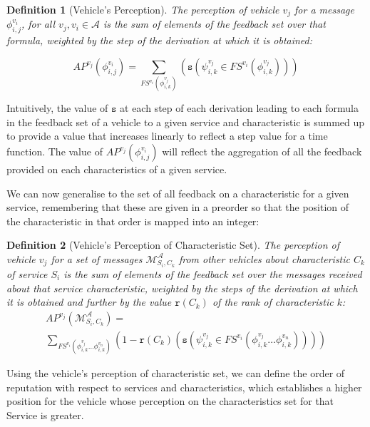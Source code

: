 \documentclass[compsoc, conference, letterpaper, 10pt, times]{IEEEtran}
\newtheorem{definition}{Definition}
\begin{document}
\begin{definition}[Vehicle's Perception]
The perception of vehicle $v_{j}$ for a message $\phi^{v_{i}}_{i,j}$, for all $v_{j}, v_{i} \in \mathcal{A}$ is the sum of elements of the feedback set over that formula, weighted by the step of the derivation at which it is obtained: 

\[
AP^{v_{j}}(\phi^{v_{i}}_{i,j})=\sum_{FS^{v_{i}}(\phi^{v_{j}}_{i,k})}(\mathtt{s}(\psi^{v_{j}}_{i,k} \in FS^{v_{i}}(\phi^{v_{j}}_{i,k})))
\]

\end{definition}

Intuitively, the value of $\mathtt{s}$ at each step of each derivation leading to each formula in the feedback set of a vehicle to a given service and characteristic is summed up to provide a value that increases linearly to reflect a step value for a time function. The value of $AP^{v_{j}}(\phi^{v_{i}}_{i,j})$ will reflect the aggregation of all the feedback provided on each characteristics of a given service.  


We can now generalise to the set of all feedback on a characteristic for a given service, remembering that these are given in a preorder so that the position of the characteristic in that order is mapped into an integer:


\begin{definition}[Vehicle's Perception of Characteristic Set]
The perception of vehicle $v_{j}$ for a set of messages $\mathcal{M}^{\mathcal{A}}_{S_{i},C_{k}}$ from other vehicles about characteristic $C_{k}$ of service $S_{i}$ is the sum of elements of the feedback set over the messages received about that service characteristic, weighted by the steps of the derivation at which it is obtained and further by the value $\mathtt{r}(C_{k})$ of the rank of characteristic $k$: 
%
\begin{displaymath}
\begin{array}{l}
AP^{v_{j}}(\mathcal{M}^{\mathcal{A}}_{S_{i}, C_{k}})=\\
\sum_{FS^{v_{i}}(\phi^{v_{j}}_{i,k}\dots \phi^{v_{n}}_{i,k})}
(1-\mathtt{r}(C_{k})(\mathtt{s}(\psi^{v_{j}}_{i,k} \in FS^{v_{i}}(\phi^{v_{j}}_{i,k}\dots \phi^{v_{n}}_{i,k}))))
\end{array}
\end{displaymath}
\end{definition}


Using the vehicle's perception of characteristic set, we can define the order of reputation with respect to services and characteristics, which establishes a higher position for the vehicle whose perception on the characteristics set for that Service is greater.
\end{document}
